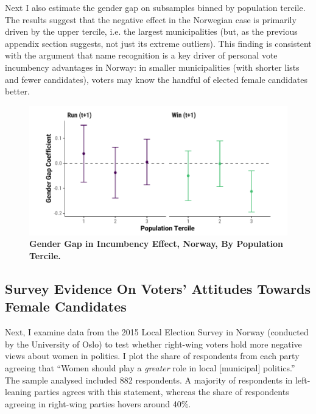 \documentclass[12pt]{article}
\begin{document}
Next I also estimate the gender gap on subsamples binned by population tercile. The results suggest that the negative effect in the Norwegian case is primarily driven by the upper tercile, i.e. the largest municipalities (but, as the previous appendix section suggests, not just its extreme outliers). This finding is consistent with the argument that name recognition is a key driver of personal vote incumbency advantages in Norway: in smaller municipalities (with shorter lists and fewer candidates), voters may know the handful of elected female candidates better.


\begin{figure}[!htb]
    \centering
    \includegraphics[width = 0.8 \textwidth]{../output/figures/norway_tercile_robust.pdf}
    \caption{\textbf{Gender Gap in Incumbency Effect, Norway, By Population Tercile.}}
    \label{fig:norway_tercile_robust}
\end{figure}



\clearpage
\subsection{Survey Evidence On Voters' Attitudes Towards Female Candidates}
\label{app:norway_survey}

Next, I examine data from the 2015 Local Election Survey in Norway (conducted by the University of Oslo) to test whether right-wing voters hold more negative views about women in politics. I plot the share of respondents from each party agreeing that ``Women should play a \emph{greater} role in local [municipal] politics.'' The sample analysed included 882 respondents. A majority of respondents in left-leaning parties agrees with this statement, whereas the share of respondents agreeing in right-wing parties hovers around 40\%.
\end{document}
